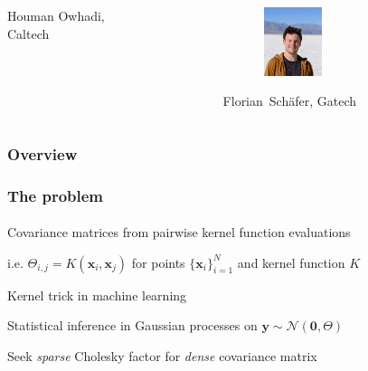 \documentclass{beamer}                             %
\newcommand*{\N}{\mathcal{N}}
\renewcommand*{\vec}[1]{\bm{#1}}
\newcommand*{\CM}{\Theta}
\newcommand*{\K}{K}
\newenvironment{wideitemize}
  {\itemize\setlength{\itemsep}{0.5cm}}
  {\enditemize}
\begin{document}
\begin{frame}
\begin{columns}
\begin{column}{0.26\textwidth}
\begin{figure}[h!]
      \end{figure}
      Houman Owhadi, \\ Caltech
    \end{column}
    \begin{column}{0.24\textwidth}
      \centering
      \begin{figure}[h!]
        \centering
        \includegraphics[width=2cm, height=2cm,
          trim={0 0 0 214px}, clip]
          {figures/people/florian_schaefer.jpg}
      \end{figure}
      Florian\ Sch{\"a}fer, Gatech
    \end{column}
  \end{columns}
\end{frame}

\begin{frame}
\frametitle{Overview}
\framesubtitle{}

\tableofcontents
\end{frame}

\begin{frame}
\frametitle{The problem}
\framesubtitle{}

\begin{wideitemize}
  \item<+-> Covariance matrices from pairwise kernel function evaluations
  \item
    i.e. \( \CM_{i, j} = \K(\vec{x}_i, \vec{x}_j) \) for points \( \{
    \vec{x}_i \}_{i = 1}^N \) and kernel function \( \K \)
  \item<+-> Kernel trick in machine learning
  \item<2-> Statistical inference in Gaussian
    processes on \( \vec{y} \sim \N(\vec{0}, \CM) \)
  \item<+-> Seek \emph{sparse} Cholesky
    factor for \emph{dense} covariance matrix
\end{wideitemize}
\end{frame}
\end{document}
